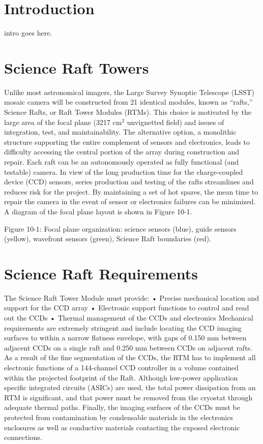 \section{Introduction}

intro goes here. 

\section{Science Raft Towers}
Unlike most astronomical imagers, the Large Survey Synoptic Telescope (LSST) mosaic camera will be constructed from 21 identical modules, known as “rafts,” Science Rafts, or Raft Tower Modules (RTMs). This choice is motivated by the large area of the focal plane (3217 cm$^2$ unvignetted field) and issues of integration, test, and maintainability. The alternative option, a monolithic structure supporting the entire complement of sensors and electronics, leads to difficulty accessing the central portion of the array during construction and repair. Each raft can be an autonomously operated as fully functional (and testable) camera. In view of the long production time for the charge-coupled device (CCD) sensors, series production and testing of the rafts streamlines and reduces risk for the project. By maintaining a set of hot spares, the mean time to repair the camera in the event of sensor or electronics failures can be minimized. A diagram of the focal plane layout is shown in Figure 10-1.
 
Figure 10-1: Focal plane organization: science sensors (blue), guide sensors (yellow), wavefront sensors (green), Science Raft boundaries (red).
 
\section{Science Raft Requirements}
The Science Raft Tower Module must provide: 
•	Precise mechanical location and support for the CCD array 
•	Electronic support functions to control and read out the CCDs
•	Thermal management of the CCDs and electronics
Mechanical requirements are extremely stringent and include locating the CCD imaging surfaces to within a narrow flatness envelope, with gaps of 0.150 mm between adjacent CCDs on a single raft and 0.250 mm between CCDs on adjacent rafts. As a result of the fine segmentation of the CCDs, the RTM has to implement all electronic functions of a 144-channel CCD controller in a volume contained within the projected footprint of the Raft. Although low-power application specific integrated circuits (ASICs) are used, the total power dissipation from an RTM is significant, and that power must be removed from the cryostat through adequate thermal paths. Finally, the imaging surfaces of the CCDs must be protected from contamination by condensable materials in the electronics enclosures as well as conductive materials contacting the exposed electronic connections.

